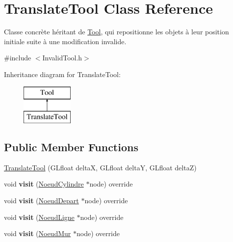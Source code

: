 \hypertarget{class_translate_tool}{}\section{Translate\+Tool Class Reference}
\label{class_translate_tool}


Classe concrète héritant de \hyperlink{class_tool}{Tool}, qui repositionne les objets à leur position initiale suite à une modification invalide.  




{\ttfamily \#include $<$Invalid\+Tool.\+h$>$}

Inheritance diagram for Translate\+Tool\+:\begin{figure}[H]
\begin{center}
\leavevmode
\includegraphics[height=2.000000cm]{class_translate_tool}
\end{center}
\end{figure}
\subsection*{Public Member Functions}
\begin{DoxyCompactItemize}
\item 
\hyperlink{group__inf2990_ga48e1c155fef64a5a07991df870721ae6}{Translate\+Tool} (G\+Lfloat delta\+X, G\+Lfloat delta\+Y, G\+Lfloat delta\+Z)
\item 
\hypertarget{group__inf2990_ga64811cbd57db1cb725dc0d472c8f5ab1}{}void {\bfseries visit} (\hyperlink{class_noeud_cylindre}{Noeud\+Cylindre} $\ast$node) override\label{group__inf2990_ga64811cbd57db1cb725dc0d472c8f5ab1}

\item 
\hypertarget{group__inf2990_gab0781475ac48f2dcb8610bfee475aba3}{}void {\bfseries visit} (\hyperlink{class_noeud_depart}{Noeud\+Depart} $\ast$node) override\label{group__inf2990_gab0781475ac48f2dcb8610bfee475aba3}

\item 
\hypertarget{group__inf2990_ga2df7046e6e0a6f3e5215b7326d349f5d}{}void {\bfseries visit} (\hyperlink{class_noeud_ligne}{Noeud\+Ligne} $\ast$node) override\label{group__inf2990_ga2df7046e6e0a6f3e5215b7326d349f5d}

\item 
\hypertarget{group__inf2990_ga7172d03575c6b5062c61753f8d0bce08}{}void {\bfseries visit} (\hyperlink{class_noeud_mur}{Noeud\+Mur} $\ast$node) override\label{group__inf2990_ga7172d03575c6b5062c61753f8d0bce08}

\end{DoxyCompactItemize}
